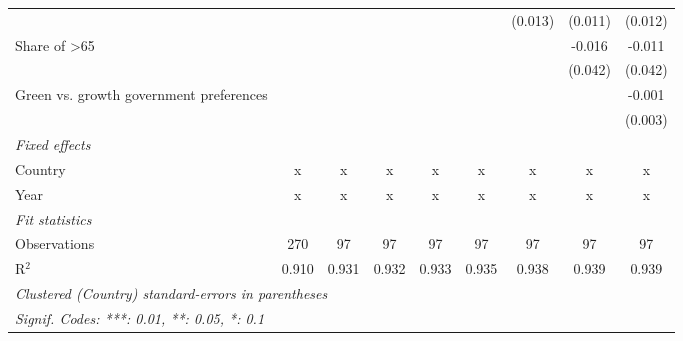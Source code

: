 \begin{table}[htbp]
\begin{tabular}{lcccccccc}
                                                   &         &         &         &         &         & (0.013) & (0.011)      & (0.012)\\   
      Share of >65                                 &         &         &         &         &         &         & -0.016       & -0.011\\   
                                                   &         &         &         &         &         &         & (0.042)      & (0.042)\\   
      Green vs. growth government preferences      &         &         &         &         &         &         &              & -0.001\\   
                                                   &         &         &         &         &         &         &              & (0.003)\\   
      \emph{Fixed effects}\\
      Country                                      & x       & x       & x       & x       & x       & x       & x            & x\\  
      Year                                         & x       & x       & x       & x       & x       & x       & x            & x\\  
      \midrule \emph{Fit statistics}\\
      Observations                                 & 270     & 97      & 97      & 97      & 97      & 97      & 97           & 97\\  
      R$^2$                                        & 0.910   & 0.931   & 0.932   & 0.933   & 0.935   & 0.938   & 0.939        & 0.939\\  
      \midrule
      \multicolumn{9}{l}{\emph{Clustered (Country) standard-errors in parentheses}}\\
      \multicolumn{9}{l}{\emph{Signif. Codes: ***: 0.01, **: 0.05, *: 0.1}}\\
   \end{tabular}
\end{table}


